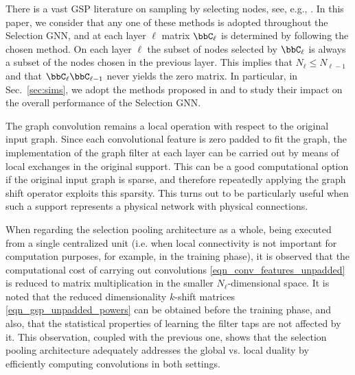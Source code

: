  There is a vast GSP literature on sampling by selecting nodes, see, e.g., \cite{chen15-selection, anis16-spectralproxies, tsitsvero16-uncertainty, puy15-scores, varma15-scores}. In this paper, we consider that any one of these methods is adopted throughout the Selection GNN, and at each layer $\ell$ matrix $\bbC_{\ell}$ is determined by following the chosen method. On each layer $\ell$ the subset of nodes selected by $\bbC_{\ell}$ is always a subset of the nodes chosen in the previous layer. This implies that $N_{\ell} \leq N_{\ell-1}$ and that $\bbC_{\ell} \bbC_{\ell-1}$ never yields the zero matrix. In particular, in Sec.~\ref{sec:sims}, we adopt the methods proposed in \cite{anis16-spectralproxies} and \cite{varma15-scores} to study their impact on the overall performance of the Selection GNN.

 The graph convolution remains a local operation with respect to the original input graph. Since each convolutional feature is zero padded to fit the graph, the implementation of the graph filter at each layer can be carried out by means of local exchanges in the original support. This can be a good computational option if the original input graph is sparse, and therefore repeatedly applying the graph shift operator exploits this sparsity. This turns out to be particularly useful when such a support represents a physical network with physical connections.

 When regarding the selection pooling architecture as a whole, being executed from a single centralized unit (i.e. when local connectivity is not important for computation purposes, for example, in the training phase), it is observed that the computational cost of carrying out convolutions \eqref{eqn_conv_features_unpadded} is reduced to matrix multiplication in the smaller $N_{\ell}$-dimensional space. It is noted that the reduced dimensionality $k$-shift matrices \eqref{eqn_gsp_unpadded_powers} can be obtained before the training phase, and also, that the statistical properties of learning the filter taps are not affected by it. This observation, coupled with the previous one, shows that the selection pooling architecture adequately addresses the global vs. local duality by efficiently computing convolutions in both settings.

